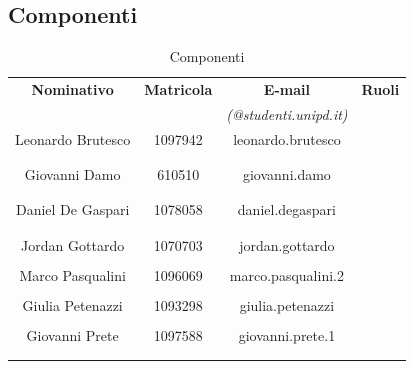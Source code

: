 \subsection{Componenti}
\begin{table}[H]
		\begin{center}
		\begin{tabular}{cccc}
			\toprule
			\textbf{Nominativo} & \textbf{Matricola} & \textbf{E-mail} & \textbf{Ruoli} \\
			 &  & \textit{(@studenti.unipd.it)} & \\
			\midrule
	 		\multirow{2}{*}{Leonardo Brutesco} & \multirow{2}{*}{1097942}	& \multirow{2}{*}{leonardo.brutesco}	& \amministratore{} \\ & & & \progettista{} \\ & & & \programmatore{} \\ & & & \verificatore{}\\
			\midrule
			\multirow{2}{*}{Giovanni Damo}	& \multirow{2}{*}{610510}	& \multirow{2}{*}{giovanni.damo} & \analista{}\\ & & &  \progettista{}\\ & & & \programmatore{}\\ & & & \verificatore{}\\
			\midrule
			\multirow{2}{*}{Daniel De Gaspari} 	& \multirow{2}{*}{1078058}	& \multirow{2}{*}{daniel.degaspari} & \responsabile{}\\ & & &  \progettista{}\\ & & & \programmatore{}\\ & & & \verificatore{}\\
			\midrule
			\multirow{2}{*}{Jordan Gottardo}	& \multirow{2}{*}{1070703}	& \multirow{2}{*}{jordan.gottardo} & \amministratore{}\\ & & &  \progettista{}\\ & & & \programmatore{} \\
			\midrule
			\multirow{3}{*}{Marco Pasqualini} & \multirow{3}{*}{1096069} &  \multirow{3}{*}{marco.pasqualini.2} & \amministratore{} \\ & & &  \progettista{} \\ & & & \programmatore{} \\ & & & \verificatore{}\\
			\midrule
			\multirow{3}{*}{Giulia	Petenazzi}	& \multirow{3}{*}{1093298}	& \multirow{3}{*}{giulia.petenazzi} & \amministratore{}\\ & & &  \progettista{} \\
			& & &  \programmatore{}\\ 			& & &  \verificatore{}\\
			\midrule
			\multirow{2}{*}{Giovanni Prete}	& \multirow{2}{*}{1097588}	& \multirow{2}{*}{giovanni.prete.1} & \responsabile{}\\ & & &  \progettista{}\\ & & & \programmatore{}\\ & & & \verificatore{}\\
			\midrule
		\end{tabular}
	\end{center}
	\caption{Componenti}
\end{table}
